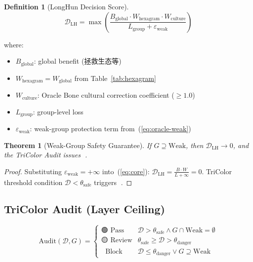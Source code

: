 \documentclass[conference]{IEEEtran}
\newtheorem{theorem}{Theorem}
\newtheorem{definition}{Definition}
\begin{document}
\begin{definition}[LongHun Decision Score]
\begin{equation}
  \mathcal{D}_{\text{LH}}
  = \max\!\left(
      \frac{
        B_{\text{global}} \cdot W_{\text{hexagram}}
        \cdot W_{\text{culture}}
      }{
        L_{\text{group}} + \varepsilon_{\text{weak}}
      }
    \right)
  \label{eq:core}
\end{equation}
\end{definition}

where:
\begin{itemize}
  \item $B_{\text{global}}$: global benefit (拯救生态等)
  \item $W_{\text{hexagram}} = W_{\text{global}}$ from
    Table~\ref{tab:hexagram}
  \item $W_{\text{culture}}$: Oracle Bone cultural
    correction coefficient ($\geq 1.0$)
  \item $L_{\text{group}}$: group-level loss
  \item $\varepsilon_{\text{weak}}$:
    weak-group protection term from~(\ref{eq:oracle-weak})
\end{itemize}

\begin{theorem}[Weak-Group Safety Guarantee]
If $G \supseteq \text{Weak}$, then
$\mathcal{D}_{\text{LH}} \to 0$,
and the TriColor Audit issues 🔴.
\end{theorem}

\begin{proof}
Substituting $\varepsilon_{\text{weak}} = +\infty$
into~(\ref{eq:core}):
$\mathcal{D}_{\text{LH}} = \frac{B \cdot W}{L + \infty}
= 0$.
TriColor threshold condition $\mathcal{D} < \theta_{\text{safe}}$
triggers 🔴.
\end{proof}

\subsection{TriColor Audit (Layer Ceiling)}

\begin{equation}
  \text{Audit}(\mathcal{D}, G) =
  \begin{cases}
    \text{🟢 Pass}    &
      \mathcal{D} > \theta_{\text{safe}}
      \land G \cap \text{Weak} = \emptyset \\[4pt]
    \text{🟡 Review}  &
      \theta_{\text{safe}} \geq \mathcal{D}
      > \theta_{\text{danger}} \\[4pt]
    \text{🔴 Block}   &
      \mathcal{D} \leq \theta_{\text{danger}}
      \lor G \supseteq \text{Weak}
  \end{cases}
  \label{eq:tricolor}
\end{equation}
\end{document}
